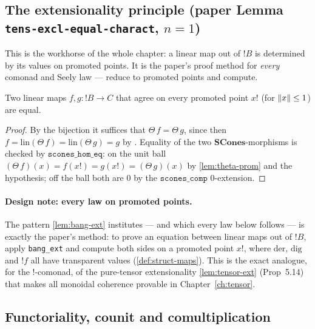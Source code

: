 \subsection{The extensionality principle (paper Lemma \texttt{tens-excl-equal-charact}, \texorpdfstring{$n = 1$}{n=1})}\label{sec:bang-ext}

This is the workhorse of the whole chapter: a linear map out of
$\mathord{!}B$ is determined by its values on promoted points. It is
the paper's proof method for \emph{every} comonad and Seely law ---
reduce to promoted points and compute.

\begin{lemma}[Promotion extensionality, paper Lemma
\texttt{tens-excl-equal-charact} ($n = 1$)]\label{lem:bang-ext}
\rocqok{}
Two linear maps $f, g : \mathord{!}B \to C$ that agree on every promoted
point $x!$ (for $\lVert x \rVert \leq 1$) are equal.
\end{lemma}

\begin{proof}
By the bijection it suffices that $\Theta\,f = \Theta\,g$, since then
$f = \mathrm{lin}(\Theta\,f) = \mathrm{lin}(\Theta\,g) = g$ by
. Equality of the two $\mathbf{SCones}$-morphisms
is checked by $\texttt{scones\_hom\_eq}$: on the unit ball
$(\Theta\,f)(x) = f(x!) = g(x!) = (\Theta\,g)(x)$ by
\autoref{lem:theta-prom} and the hypothesis; off the ball both are $0$
by the $\texttt{scones\_comp}$ $0$-extension.
\end{proof}

\paragraph{Design note: every law on promoted points.}
The pattern \autoref{lem:bang-ext} institutes --- and which every law
below follows --- is exactly the paper's method: to prove an equation
between linear maps out of $\mathord{!}B$, apply \texttt{bang\_ext} and
compute both sides on a promoted point $x!$, where $\mathrm{der}$,
$\mathrm{dig}$ and $\mathord{!}f$ all have transparent values
(\autoref{def:struct-maps}). This is the exact analogue, for the
$\mathord{!}$-comonad, of the pure-tensor extensionality
\autoref{lem:tensor-ext} (Prop~5.14) that makes all monoidal coherence
provable in Chapter~\ref{ch:tensor}.

\subsection{Functoriality, counit and comultiplication}\label{sec:struct-maps}

